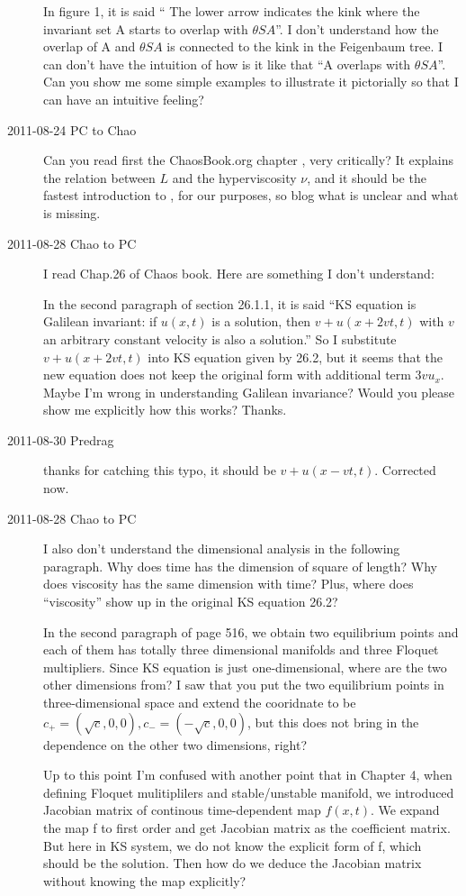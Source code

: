 \begin{description}
In figure 1, it is said `` The lower arrow indicates the kink where the invariant set A starts to overlap with $\theta SA$''. I don't understand how the overlap of A and $\theta SA$ is connected to the kink in the Feigenbaum tree. I can don't have the intuition of how is it like that ``A overlaps with $\theta SA$''. Can you show me some simple examples to illustrate it pictorially so that I can have an intuitive feeling?




\item[2011-08-24 PC to Chao] Can you read first the ChaosBook.org chapter , very critically?
It explains the relation between $L$ and the hyperviscosity $\nu$, and
it should be the fastest introduction to \KSe, for our purposes, so
blog what is unclear and what is missing.

\item[2011-08-28 Chao to PC] I read Chap.26 of Chaos book.
Here are something I don't understand:

In the second paragraph of section 26.1.1, it is said ``KS equation is Galilean invariant: if $u(x,t)$ is a solution, then $v+u(x+2vt,t)$ with $v$ an arbitrary constant velocity is also a solution.'' So I substitute $v+u(x+2vt,t)$ into KS equation given by 26.2, but it seems that the new equation does not keep the original form with additional term $3vu_x$. Maybe I'm wrong in understanding Galilean invariance? Would you please show me explicitly how this works? Thanks.

\item[2011-08-30 Predrag] thanks for catching this typo, it should be
$v+u(x-vt,t)$. Corrected now.

\item[2011-08-28 Chao to PC] 
I also don't understand the dimensional analysis in the following paragraph. Why does time has the dimension of square of length? Why does viscosity has the same dimension with time? Plus, where does ``viscosity'' show up in the original KS equation 26.2?

In the second paragraph of page 516, we obtain two equilibrium points and each of them has totally three dimensional manifolds and three Floquet multipliers. Since KS equation is just one-dimensional, where are the two other dimensions from? I saw that you put the two equilibrium points in three-dimensional space and extend the cooridnate to be $c_+ = (\sqrt{c},0,0),c_- = (-\sqrt{c},0,0)$, but this does not bring in the dependence on the other two dimensions, right?

Up to this point I'm confused with another point that in Chapter 4, when defining Floquet mulitiplilers and stable/unstable manifold, we introduced Jacobian matrix of continous time-dependent map $f(x,t)$. We expand the map f to first order and get Jacobian matrix as the coefficient matrix. But here in KS system, we do not know the explicit form of f, which should be the solution. Then how do we deduce the Jacobian matrix without knowing the map explicitly?

\end{description}

